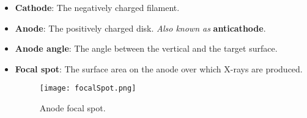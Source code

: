 \documentclass[../notes.tex]{subfiles}
\begin{document}
\begin{itemize}
\begin{figure}[h!]
\begin{subfigure}[b]{0.4\linewidth}
            \label{fig:xrayTubea}
        \end{subfigure}
        \begin{subfigure}[b]{0.4\linewidth}
            \centering
            \texttt{[image: xrayTubeb.png]}
            \caption{Electrons to X-rays.}
            \label{fig:xrayTubeb}
        \end{subfigure}
        \caption{X-ray tube design.}
        \label{fig:xrayTube}
    \end{figure}
    \begin{itemize}
        \item The \textbf{cathode} heats up and induces thermionic emission of a cloud of electrons.
        \item The \textbf{anode} attracts the electrons across the vacuum tube.
        \item The anode converts the energy of incident electrons into X-rays, dissipating heat as a byproduct.
        \item You rotate the anode very fast (up to \SI{10000}{\revolutionsperminute}) to prevent it from overheating (can get up to \SI{2000}{\celsius}). This is why you often have a cooling system in high-power X-rays.
        \item The anode is a beveled disk (shaped to focus the X-rays).
        \item Most X-ray tubes have an \textbf{anode angle} of \SIrange{12}{15}{\degree}.
        \begin{itemize}
            \item A smaller angle results in a smaller effective \textbf{focal spot}.
        \end{itemize}
    \end{itemize}
    \item \textbf{Cathode}: The negatively charged filament.
    \item \textbf{Anode}: The positively charged disk. \emph{Also known as} \textbf{anticathode}.
    \item \textbf{Anode angle}: The angle between the vertical and the target surface.
    \item \textbf{Focal spot}: The surface area on the anode over which X-rays are produced.
    \begin{figure}[h!]
        \centering
        \texttt{[image: focalSpot.png]}
        \caption{Anode focal spot.}
        \label{fig:focalSpot}
    \end{figure}
    \begin{itemize}

\end{itemize}
\end{itemize}
\end{document}

